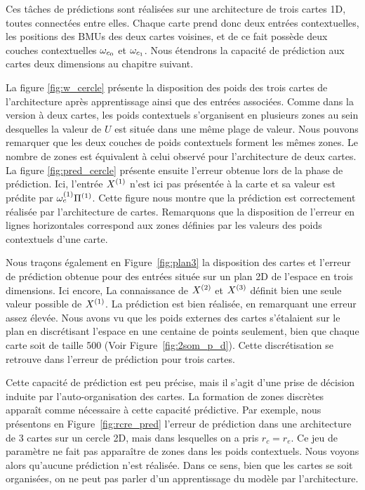 \documentclass[../main]{subfiles}
\begin{document}
Ces tâches de prédictions sont réalisées sur une architecture de trois cartes 1D, toutes connectées entre elles. 
Chaque carte prend donc deux entrées contextuelles, les positions des BMUs des deux cartes voisines, et de ce fait possède deux couches contextuelles $\omega_{c_0}$ et $\omega_{c_1}$.
Nous étendrons la capacité de prédiction aux cartes deux dimensions au chapitre suivant.


La figure \ref{fig:w_cercle} présente la disposition des poids des trois cartes de l'architecture après apprentissage ainsi que des entrées associées. 
Comme dans la version à deux cartes, les poids contextuels s'organisent en plusieurs zones au sein desquelles la valeur de $U$ est située dans une même plage de valeur.
Nous pouvons remarquer que les deux couches de poids contextuels forment les mêmes zones. Le nombre de zones est équivalent à celui observé pour l'architecture de deux cartes.
La figure \ref{fig:pred_cercle} présente ensuite l'erreur obtenue lors de la phase de prédiction. 
Ici, l'entrée $X^{({1})}$ n'est ici pas présentée à la carte et sa valeur est prédite par $\omega_{e}^{({1})}{\Pi^{({1})}}$. 
Cette figure nous montre que la prédiction est correctement réalisée par l'architecture de cartes. Remarquons que la disposition de l'erreur en lignes horizontales correspond aux zones définies par les valeurs des poids contextuels d'une carte.

Nous traçons également en Figure~\ref{fig:plan3} la disposition des cartes et l'erreur de prédiction obtenue pour des entrées située sur un plan 2D de l'espace en trois dimensions. Ici encore, La connaissance de $X^{({2})}$ et $X^{({3})}$ définit bien une seule valeur possible de $X^{({1})}$. La prédiction est bien réalisée, en remarquant une erreur assez élevée. 
Nous avons vu que les poids externes des cartes s'étalaient sur le plan en discrétisant l'espace en une centaine de points seulement, bien que chaque carte soit de taille 500 (Voir Figure~\ref{fig:2som_p_d}). 
Cette discrétisation se retrouve dans l'erreur de prédiction pour trois cartes.

Cette capacité de prédiction est peu précise, mais il s'agit d'une prise de décision induite par l'auto-organisation des cartes.
La formation de zones discrètes apparaît comme nécessaire à cette capacité prédictive. Par exemple, nous présentons en Figure~\ref{fig:rcre_pred} l'erreur de prédiction dans une architecture de 3 cartes sur un cercle 2D, mais dans lesquelles on a pris $r_c = r_e$. Ce jeu de paramètre ne fait pas apparaître de zones dans les poids contextuels. Nous voyons alors qu'aucune prédiction n'est réalisée. Dans ce sens, bien que les cartes se soit organisées, on ne peut pas parler d'un apprentissage du modèle par l'architecture.
\end{document}
